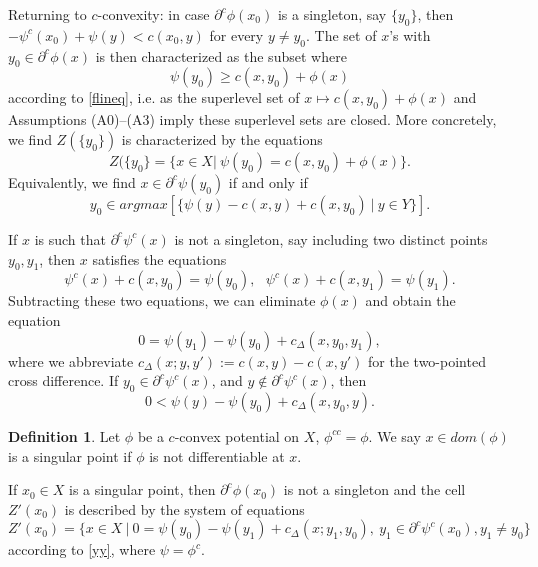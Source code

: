 \documentclass[12pt]{amsart}
\theoremstyle{definition}
\newtheorem{dfn}{Definition}
\theoremstyle{remark}
\newcommand{\del}{\partial}
\newcommand{\cd}{c_\Delta}
\begin{document}
Returning to $c$-convexity: in case $\del^c \phi(x_0)$ is a singleton, say $\{y_0\}$, then $-\psi^c(x_0)+\psi(y)<c(x_0,y)$ for every $y\neq y_0$. The set of $x$'s with $y_0\in \del^c\phi(x)$ is then characterized as the subset where $$\psi(y_0) \geq c(x,y_0)+\phi(x)$$ according to \eqref{flineq}, i.e. as the superlevel set of $x\mapsto c(x,y_0)+\phi(x)$ and Assumptions (A0)--(A3) imply these superlevel sets are closed. More concretely, we find $Z(\{y_0\})$ is characterized by the equations \begin{equation} Z(\{y_0\}=\{x \in X|~\psi(y_0)=c(x,y_0)+\phi(x)\}.\label{singlesub} \end{equation} Equivalently,  we find $x\in \del^c \psi(y_0)$ if and only if \begin{equation} y_0\in argmax[\{ \psi(y) - c(x,y)+c(x,y_0)~|~ y\in Y \}]. \label{yy}\end{equation}


If $x$ is such that $\del^c \psi^c(x)$ is not a singleton, say including two distinct points $y_0,y_1$, then $x$ satisfies the equations $$\psi^c(x)+c(x,y_0)=\psi(y_0), ~~~\psi^c(x)+c(x,y_1)=\psi(y_1).$$ Subtracting these two equations, we can eliminate $\phi(x)$ and obtain the equation $$0=\psi(y_1)-\psi(y_0)+\cd(x,y_0,y_1),$$ where we abbreviate $c_\Delta(x;y, y'):=c(x,y)-c(x,y')$ for the two-pointed cross difference. If $y_0\in \del^c \psi^c(x)$, and $y\notin \del^c \psi^c(x)$, then $$0<\psi(y)-\psi(y_0)+\cd(x,y_0,y).$$ %







\begin{dfn}
Let $\phi$ be a $c$-convex potential on $X$, $\phi^{cc}=\phi$. We say $x\in dom(\phi)$ is a singular point if $\phi$ is not differentiable at $x$.  
\end{dfn}
If $x_0\in X$ is a singular point, then $\del^c \phi(x_0)$ is not a singleton and the cell $Z'(x_0)$ is described by the system of equations \begin{equation} Z'(x_0)=\{x\in X~|~ 0=\psi(y_0)-\psi(y_1) +\cd(x; y_1, y_0), ~ y_1 \in \del^c \psi^c(x_0), y_1\neq y_0\} \label{dceq}\end{equation} according to \eqref{yy}, where $\psi=\phi^c$.
\end{document}

